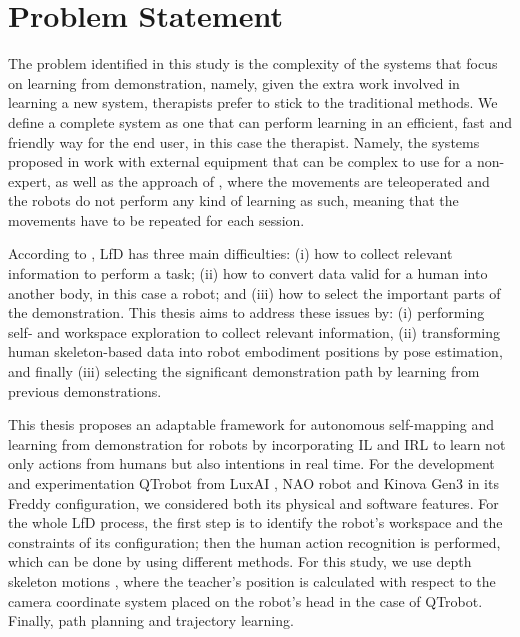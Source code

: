 \documentclass[thesis]{mas_proposal}
\begin{document}
\section{Problem Statement}
    
    The problem identified in this study is the complexity of the systems that focus on learning from demonstration, namely, given the extra work involved in learning a new system, therapists prefer to stick to the traditional methods. We define a complete system as one that can perform learning in an efficient, fast and friendly way for the end user, in this case the therapist. Namely, the systems proposed in \cite{Hua2021, Koenemann2012} work with external equipment that can be complex to use for a non-expert, as well as the approach of \cite{Si2021, Assad2020, Kulikovskiy2021}, where the movements are teleoperated and the robots do not perform any kind of learning as such, meaning that the movements have to be repeated for each session.
    
    According to \cite{Lopes2005}, LfD has three main difficulties: (i) how to collect relevant information to perform a task; (ii) how to convert data valid for a human into another body, in this case a robot; and (iii) how to select the important parts of the demonstration. This thesis aims to address these issues by: (i) performing self- and workspace exploration to collect relevant information, (ii) transforming human skeleton-based data into robot embodiment positions by pose estimation, and finally (iii) selecting the significant demonstration path by learning from previous demonstrations.
    
    This thesis proposes an adaptable framework for autonomous self-mapping and learning from demonstration for robots by incorporating IL and IRL to learn not only actions from humans but also intentions in real time. For the development and experimentation QTrobot from LuxAI \cite{qtrobot_safety_manual}, NAO robot and Kinova Gen3 in its Freddy configuration, we considered both its physical and software features. For the whole LfD process, the first step is to identify the robot's workspace and the constraints of its configuration; then the human action recognition is performed, which can be done by using different methods. For this study, we use depth skeleton motions \cite{Chen2016}, where the teacher's position is calculated with respect to the camera coordinate system placed on the robot's head in the case of QTrobot. Finally, path planning and trajectory learning.
    
\end{document}
